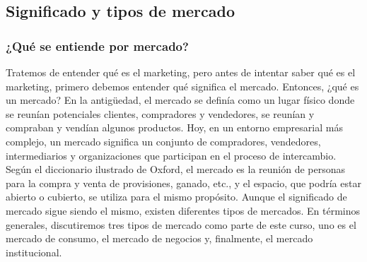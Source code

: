 \documentclass[10pt]{book}
\begin{document}
\subsection{Significado y tipos de mercado}
\subsubsection{¿Qué se entiende por mercado?}
Tratemos de entender qué es el marketing, pero antes de intentar saber qué es el marketing, primero debemos entender qué significa el mercado. Entonces, ¿qué es un mercado? En la antigüedad, el mercado se definía como un lugar físico donde se reunían potenciales clientes, compradores y vendedores, se reunían y compraban y vendían algunos productos. Hoy, en un entorno empresarial más complejo, un mercado significa un conjunto de compradores, vendedores, intermediarios y organizaciones que participan en el proceso de intercambio.\\
Según el diccionario ilustrado de Oxford, el mercado es la reunión de personas para la compra y venta de provisiones, ganado, etc., y el espacio, que podría estar abierto o cubierto, se utiliza para el mismo propósito. Aunque el significado de mercado sigue siendo el mismo, existen diferentes tipos de mercados. En términos generales, discutiremos tres tipos de mercado como parte de este curso, uno es el mercado de consumo, el mercado de negocios y, finalmente, el mercado institucional.
\end{document}
